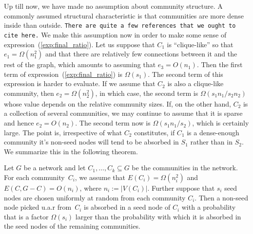 Up till now, we have made no assumption about community structure. 
A commonly assumed structural characteristic is that communities 
are more dense inside than outside. \texttt{There are quite a few 
references that we ought to cite here.} We make this 
assumption now in order to make some sense of expression~(\ref{exp:final_ratio}).
Let us suppose that $C_1$ is ``clique-like'' so that $e_1 = \Omega(n_1^2)$ and 
that there are relatively few connections between it and the rest of the 
graph, which amounts to assuming that $e_3 = O(n_1)$. Then the first term 
of expression~(\ref{exp:final_ratio}) is $\Omega(s_1)$. The second 
term of this expression is harder to evaluate. If we assume that $C_2$ 
is also a clique-like community, then $e_2 = \Omega (n_2^2)$, in which 
case, the second term is $\Omega(s_1 n_1 /s_2 n_2)$ whose value 
depends on the relative community sizes. If, on the other hand, $C_2$ 
is a collection of several communities, we may continue to assume that 
it is sparse and hence $e_2 = O(n_2)$. The second term now is $\Omega(s_1 n_1 / s_2)$,
which is certainly large. The point is, irrespective of what $C_2$ constitutes, 
if $C_1$ is a dense-enough community it's non-seed nodes will tend to be absorbed
in $S_1$ rather than in $S_2$. We summarize this in the following theorem.
\begin{theorem}
    Let $G$ be a network and let $C_1, \ldots, C_k \subseteq G$ be the 
    communities in the network. For each community~$C_i$, we assume that 
    $E(C_i) = \Omega (n_i^2)$ and $E(C, G - C) = O(n_i)$, where $n_i := |V(C_i)|$.
    Further suppose that $s_i$ seed nodes are chosen uniformly at random from each 
    community $C_i$. Then a non-seed node picked u.a.r from~$C_i$ is absorbed 
    in a seed node of $C_i$ with a probability that is a factor $\Omega(s_i)$ 
    larger than the probability with which it is absorbed in the seed nodes 
    of the remaining communities.
\end{theorem}
